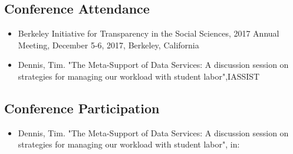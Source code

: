 \subsection{Conference Attendance}


\begin{itemize}[label={},leftmargin=!,labelindent=5pt,itemindent=-15pt]
  \item Berkeley Initiative for Transparency in the Social Sciences, 2017 Annual Meeting, December 5-6, 2017, Berkeley, California
  \item Dennis, Tim. "The Meta-Support of Data Services: A discussion session on strategies for managing our workload with student labor",IASSIST 
\end{itemize}


\subsection{Conference Participation}


\begin{itemize}[label={},leftmargin=!,labelindent=5pt,itemindent=-15pt]
\item Dennis, Tim. "The Meta-Support of Data Services: A discussion session on strategies for managing our workload with student labor", in: 

\end{itemize}

